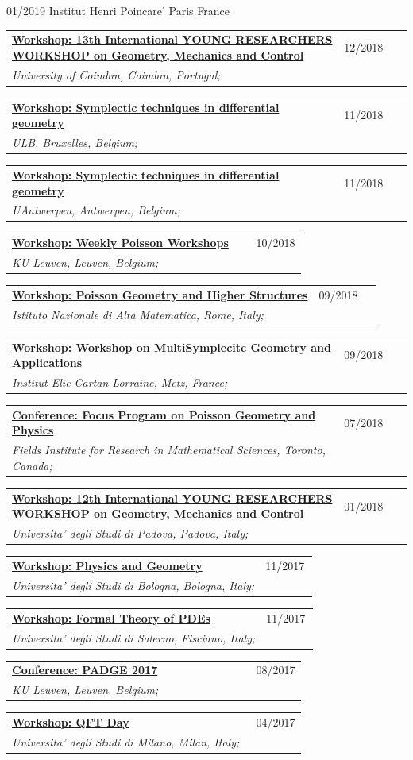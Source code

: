 \documentclass[a4paper]{article}
\newcommand{\longvoice}[8]{
	\begin{tabular}{p{0.83\linewidth} p{0.17\linewidth} }
		\textbf{\href{#3}{#2: #1}} & #4 
		\\ 
		\textit{#5, #6, #7;} & {\small\emph{#8}}
	\end{tabular}
	\vspace{.5em}
}
\begin{document}
		{01/2019}
		{Institut Henri Poincare'}
		{Paris}
		{France}
		{}
	\longvoice{13th International YOUNG RESEARCHERS WORKSHOP on Geometry, Mechanics and Control}
		{Workshop}
		{https://web.archive.org/web/20190831103121/http://www.uc.pt/en/congressos/13yrw/programa}
		{12/2018}
		{University of Coimbra}
		{Coimbra}
		{Portugal}
		{}
	\longvoice{Symplectic techniques in differential geometry}
		{Workshop}
		{https://www.uantwerpen.be/nl/personeel/sonja-hohloch/private-webpage/excellence-of-scienc/minicourses/}
		{11/2018}
		{ULB}
		{Bruxelles}
		{Belgium}
		{}
	\longvoice{Symplectic techniques in differential geometry}
		{Workshop}
		{https://www.uantwerpen.be/nl/personeel/sonja-hohloch/private-webpage/excellence-of-scienc/minicourses/}
		{11/2018}
		{UAntwerpen}
		{Antwerpen}
		{Belgium}
		{}
	\longvoice{Weekly Poisson Workshops}
		{Workshop}
		{https://wis.kuleuven.be/meetkunde/PoissonWorkingGroup}
		{10/2018}
		{KU Leuven}
		{Leuven}
		{Belgium}
		{}
	\longvoice{Poisson Geometry and Higher Structures}
		{Workshop}
		{https://web.archive.org/web/20190831103317/http://www1.mat.uniroma1.it/ricerca/convegni/2018/hippo2018/index.html}
		{09/2018}
		{Istituto Nazionale di Alta Matematica}
		{Rome}
		{Italy}
		{}
	\longvoice{Workshop on MultiSymplecitc Geometry and Applications}
		{Workshop}
		{https://web.archive.org/web/20180704152639/http://www.math.univ-metz.fr/~wurzbacher/GEMSA.html}
		{09/2018}
		{Institut Elie Cartan Lorraine}
		{Metz}
		{France}
		{}
	\longvoice{Focus Program on Poisson Geometry and Physics}
		{Conference}
		{https://web.archive.org/web/20190831105328/http://www.fields.utoronto.ca/activities/18-19/poisson-2018}
		{07/2018}
		{Fields Institute for Research in Mathematical Sciences}
		{Toronto}
		{Canada}
		{}
	\longvoice{12th International YOUNG RESEARCHERS WORKSHOP on Geometry, Mechanics and Control}
		{Workshop}
		{http://events.math.unipd.it/12YRW/}
		{01/2018}
		{Universita' degli Studi di Padova}
		{Padova}
		{Italy}
		{}
	\longvoice{Physics and Geometry}
		{Workshop}
		{https://agenda.infn.it/conferenceDisplay.py?confId=14261}
		{11/2017}
		{Universita' degli Studi di Bologna}
		{Bologna}
		{Italy}
		{}
	\longvoice{Formal Theory of PDEs}
		{Workshop}
		{http://www.dipmat2.unisa.it/people/vitagliano/www/micro-workshop.html}
		{11/2017}
		{Universita' degli Studi di Salerno}
		{Fisciano}
		{Italy}
		{}
	\longvoice{PADGE 2017}
		{Conference}
		{https://web.archive.org/web/20170924130155/https://wis.kuleuven.be/events/padge2017}
		{08/2017}
		{KU Leuven}
		{Leuven}
		{Belgium}
		{}
	\longvoice{QFT Day}
		{Workshop}
		{https://web.archive.org/web/20170924130005/http://www.matematica.unimi.it/extfiles/unimidire/66001/attachment/qft-day-2017-1.pdf}
		{04/2017}
		{Universita' degli Studi di Milano}
		{Milan}
		{Italy}
		{}
\end{document}

